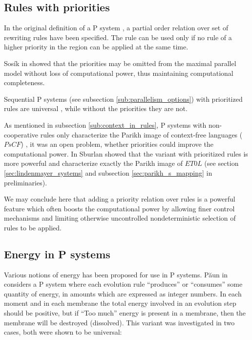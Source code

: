 
\subsection{Rules with priorities} %
\label{sub:rules_with_priorities}

 In the original definition of a P system \cite{Paun98}, a partial order relation over set of rewriting rules have been specified. The rule can be used only if no rule of a higher priority in the region can be applied at the same time.

Sos\'ik in \cite{Sosik:2002:WithoutPriorities} showed that the priorities may be omitted from the maximal parallel model without loss of computational power, thus maintaining computational completeness.

 Sequential P systems (see subsection \ref{sub:parallelism_options}) with prioritized rules are universal \cite{Ibarra05Active}, while without the priorities they are not.

As mentioned in subsection \ref{sub:context_in_rules}, P systems with non-cooperative rules only characterize the Parikh image of context-free languages ($PsCF$) \cite{Sburlan05dragos}, it was an open problem, whether priorities could improve the computational power. In \cite{Sburlan05Priorities} Sburlan showed that the variant with prioritized rules is more powerful and characterize exactly the  Parikh image of $ET0L$ (see section \ref{sec:lindenmayer_systems} and subsection \ref{sec:parikh_s_mapping} in preliminaries).

We may conclude here that adding a priority relation over rules is a powerful feature which often boosts the computational power by allowing finer control mechanisms and limiting otherwise uncontrolled nondeterministic selection of rules to be applied.


\subsection{Energy in P systems} %
\label{sub:energy_in_p_systems}

 Various notions of energy has been proposed for use in P systems. P\u{a}un in \cite{Paun:2001:Energy} considers a P system where each evolution rule ``produces'' or ``consumes'' some quantity of energy, in amounts which are expressed as integer numbers. In each moment and in each membrane the total energy involved in an evolution step should be positive, but if ``Too much'' energy is present in a membrane, then the membrane will be destroyed (dissolved). This variant was investigated in two cases, both were shown to be universal:

